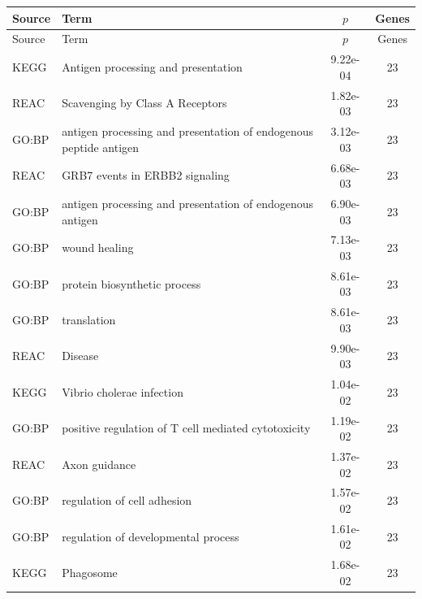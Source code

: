 \begin{longtable}{llcc}\toprule
Source & Term & $p$ & Genes \\
\midrule
\endfirsthead
\toprule Source & Term & $p$ & Genes \\ \midrule \endhead
KEGG & Antigen processing and presentation & 9.22e-04 & 23 \\
REAC & Scavenging by Class A Receptors & 1.82e-03 & 23 \\
GO:BP & antigen processing and presentation of endogenous peptide antigen & 3.12e-03 & 23 \\
REAC & GRB7 events in ERBB2 signaling & 6.68e-03 & 23 \\
GO:BP & antigen processing and presentation of endogenous antigen & 6.90e-03 & 23 \\
GO:BP & wound healing & 7.13e-03 & 23 \\
GO:BP & protein biosynthetic process & 8.61e-03 & 23 \\
GO:BP & translation & 8.61e-03 & 23 \\
REAC & Disease & 9.90e-03 & 23 \\
KEGG & Vibrio cholerae infection & 1.04e-02 & 23 \\
GO:BP & positive regulation of T cell mediated cytotoxicity & 1.19e-02 & 23 \\
REAC & Axon guidance & 1.37e-02 & 23 \\
GO:BP & regulation of cell adhesion & 1.57e-02 & 23 \\
GO:BP & regulation of developmental process & 1.61e-02 & 23 \\
KEGG & Phagosome & 1.68e-02 & 23 \\
\bottomrule
\end{longtable}
